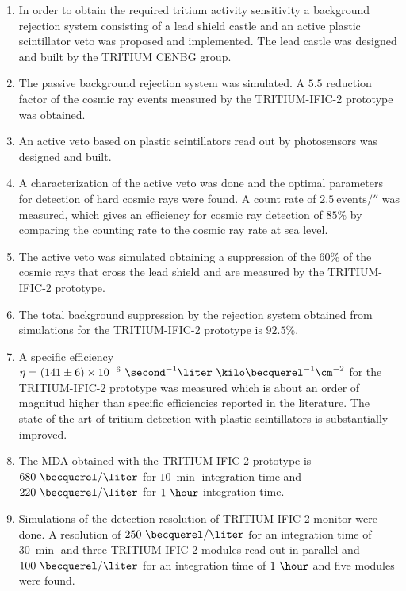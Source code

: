 \begin{enumerate}
\item{} In order to obtain the required tritium activity sensitivity a background rejection system consisting of a lead shield castle and an active plastic scintillator veto was proposed and implemented. The lead castle was designed and built by the TRITIUM CENBG group.

\item{} The passive background rejection system was simulated. A $5.5$ reduction factor of the cosmic ray events measured by the TRITIUM-IFIC-2 prototype was obtained.

\item{} An active veto based on plastic scintillators read out by photosensors was designed and built.

\item{} A characterization of the active veto was done and the optimal parameters for detection of hard cosmic rays were found. A count rate of $2.5~\text{events}/\second$ was measured, which gives an efficiency for cosmic ray detection of $85\%$ by comparing the counting rate to the cosmic ray rate at sea level.

\item{} The active veto was simulated obtaining a suppression of the $60\%$ of the cosmic rays that cross the lead shield and are measured by the TRITIUM-IFIC-2 prototype.

\item{} The total background suppression by the rejection system obtained from simulations for the TRITIUM-IFIC-2 prototype is $92.5\%$.

\item{} A specific efficiency $\eta = (141 \pm 6) \times 10^{-6}~ \second^{-1}  \liter ~ \kilo\becquerel^{-1} \cm^{-2}$ for the TRITIUM-IFIC-2  prototype was measured which is about an order of magnitud higher than specific efficiencies reported in the literature. The state-of-the-art of tritium detection with plastic scintillators is substantially improved.

\item{} The MDA obtained with the TRITIUM-IFIC-2 prototype is $680~\becquerel/\liter$  for $10~\min$ integration time and $220~\becquerel/\liter$  for $1~\hour$ integration time.

\item{} Simulations of the detection resolution of TRITIUM-IFIC-2 monitor were done. A resolution of $250~\becquerel/\liter$ for an integration time of $30~\min$ and three TRITIUM-IFIC-2 modules read out in parallel and $100~\becquerel/\liter$ for an integration time of $1~\hour$ and five modules were found.


\end{enumerate}

